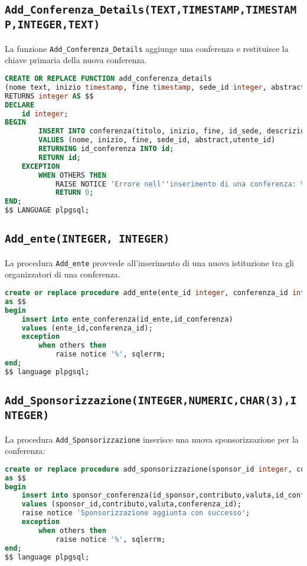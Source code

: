 \subsection{\texttt{Add\_Conferenza\_Details(TEXT,TIMESTAMP,TIMESTAMP,INTEGER,TEXT)}}
La funzione \texttt{Add\_Conferenza\_Details} aggiunge una conferenza e restituisce la chiave primaria della nuova conferenza.
\begin{lstlisting}[language=SQL,style=mystyle]
CREATE OR REPLACE FUNCTION add_conferenza_details
(nome text, inizio timestamp, fine timestamp, sede_id integer, abstract text, utente_id integer)
RETURNS integer AS $$
DECLARE
    id integer;
BEGIN
        INSERT INTO conferenza(titolo, inizio, fine, id_sede, descrizione, id_utente) 
        VALUES (nome, inizio, fine, sede_id, abstract,utente_id)
        RETURNING id_conferenza INTO id;
        RETURN id;
    EXCEPTION
        WHEN OTHERS THEN
            RAISE NOTICE 'Errore nell''inserimento di una conferenza: %', SQLERRM;
            RETURN 0; 
END;
$$ LANGUAGE plpgsql;
\end{lstlisting}
\subsection{\texttt{Add\_ente(INTEGER, INTEGER)}}
La procedura \texttt{Add\_ente} provvede all'inserimento di una nuova istituzione tra gli organizzatori di una conferenza.
\begin{lstlisting}[language=SQL,style=mystyle]
create or replace procedure add_ente(ente_id integer, conferenza_id integer)
as $$
begin
    insert into ente_conferenza(id_ente,id_conferenza)
    values (ente_id,conferenza_id);
    exception
        when others then
            raise notice '%', sqlerrm;
end;
$$ language plpgsql;
\end{lstlisting}
\subsection{\texttt{Add\_Sponsorizzazione(INTEGER,NUMERIC,CHAR(3),INTEGER)}}
La procedura \texttt{Add\_Sponsorizzazione} inserisce una nuova sponsorizzazione per la conferenza:
\begin{lstlisting}[language=SQL, style=mystyle]
create or replace procedure add_sponsorizzazione(sponsor_id integer, contributo numeric(1000,2), valuta char(3), conferenza_id integer)
as $$
begin
    insert into sponsor_conferenza(id_sponsor,contributo,valuta,id_conferenza)
    values (sponsor_id,contributo,valuta,conferenza_id);
    raise notice 'Sponsorizzazione aggiunta con successo';
    exception
        when others then
            raise notice '%', sqlerrm;
end;
$$ language plpgsql;
\end{lstlisting}
